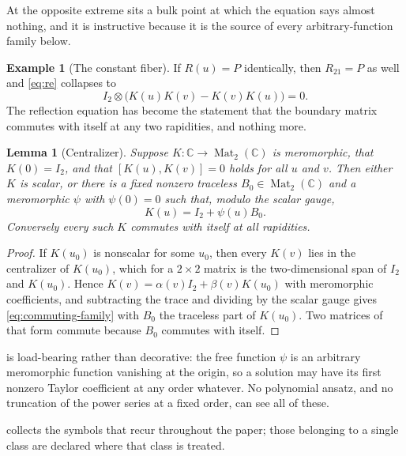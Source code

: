 \documentclass[11pt,reqno]{amsart}
\theoremstyle{plain}
\newtheorem{lemma}[theorem]{Lemma}
\theoremstyle{definition}
\newtheorem{example}[theorem]{Example}
\theoremstyle{remark}
\numberwithin{equation}{section}
\newcommand{\Mat}{\operatorname{Mat}}
\newcommand{\C}{\mathbb C}
\newcommand{\Id}{I_2}
\begin{document}
At the opposite extreme sits a bulk point at which the equation says almost
nothing, and it is instructive because it is the source of every
arbitrary-function family below.

\begin{example}[The constant fiber]
\label{ex:constant}
If $R(u)=P$ identically, then $R_{21}=P$ as well and \cref{eq:re} collapses to
\begin{equation}
\Id\otimes\bigl(K(u)K(v)-K(v)K(u)\bigr)=0.
\label{eq:constant-fiber}
\end{equation}
The reflection equation has become the statement that the boundary matrix
commutes with itself at any two rapidities, and nothing more.
\end{example}

\begin{lemma}[Centralizer]
\label{lem:centralizer}
Suppose $K:\C\to\Mat_2(\C)$ is meromorphic, that $K(0)=\Id$, and that
$[K(u),K(v)]=0$ holds for all $u$ and $v$. Then either $K$ is scalar, or there is a fixed
nonzero traceless $B_0\in\Mat_2(\C)$ and a meromorphic $\psi$ with $\psi(0)=0$
such that, modulo the scalar gauge,
\begin{equation}
K(u)=\Id+\psi(u)B_0.                  \label{eq:commuting-family}
\end{equation}
Conversely every such $K$ commutes with itself at all rapidities.
\end{lemma}

\begin{proof}
If $K(u_0)$ is nonscalar for some $u_0$, then every $K(v)$ lies in the
centralizer of $K(u_0)$, which for a $2\times2$ matrix is the two-dimensional
span of $\Id$ and $K(u_0)$. Hence $K(v)=\alpha(v)\Id+\beta(v)K(u_0)$ with
meromorphic coefficients, and subtracting the trace and dividing by the scalar
gauge gives \cref{eq:commuting-family} with $B_0$ the traceless part of
$K(u_0)$. Two matrices of that form commute because $B_0$ commutes with itself.
\end{proof}

 is load-bearing rather than decorative: the free
function $\psi$ is an arbitrary meromorphic function vanishing at the origin, so
a solution may have its first nonzero Taylor coefficient at any order whatever.
No polynomial ansatz, and no truncation of the power series at a fixed order, can
see all of these.

 collects the symbols that recur throughout the paper; those
belonging to a single class are declared where that class is treated.
\end{document}

